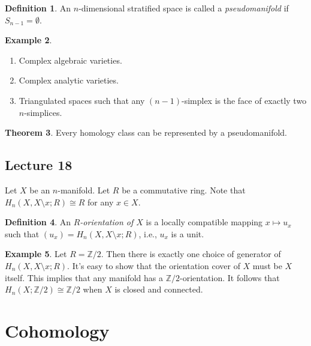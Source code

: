 \documentclass[10pt,letterpaper,cm]{nupset}
\theoremstyle{definition}
\newtheorem{definition}{Definition}[subsection]
\newtheorem{exmp}[definition]{Example}
\theoremstyle{theorem}
\newtheorem{theorem}[definition]{Theorem}
\theoremstyle{remark}
\newcommand{\Z}{\mathbb Z}
\newcommand{\1}{\mathbb{1}}
\newcommand{\0}{\vec 0}
\begin{document}
\begin{definition}
An $n$-dimensional stratified space is called a \textit{pseudomanifold} if $S_{n-1} = \emptyset$.
\end{definition}

\begin{exmp} $ $
\begin{enumerate}
\item Complex algebraic varieties.
\item Complex analytic varieties.
\item Triangulated spaces such that any $\left(n-1\right)$-simplex is the face of exactly two $n$-simplices. 
\end{enumerate}
\end{exmp}

\begin{theorem}
Every homology class can be represented by a pseudomanifold. 
\end{theorem}

\subsection{Lecture 18}

Let $X$ be an $n$-manifold. Let $R$ be a commutative ring. Note that $H_n(X, X \setminus x; R) \cong R$ for any $x\in X$.

\begin{definition}\label{RO}
  An \textit{$R$-orientation of $X$} is a locally compatible mapping $x\mapsto u_x$  such that $\left(u_x\right) = H_n(X, X \setminus x; R)$, i.e., $u_x$ is a unit.
\end{definition}

\begin{exmp}
Let $R= \Z/2$. Then there is exactly one choice of generator of $ H_n(X, X \setminus x; R)$. It's easy to show that the orientation cover of $X$ must be $X$ itself. This implies that any manifold has a $\Z/2$-orientation. It follows that $H_n(X; \Z/2) \cong \Z/2$ when $X$ is closed and connected. 
\end{exmp}

\section{Cohomology} 
\end{document}
